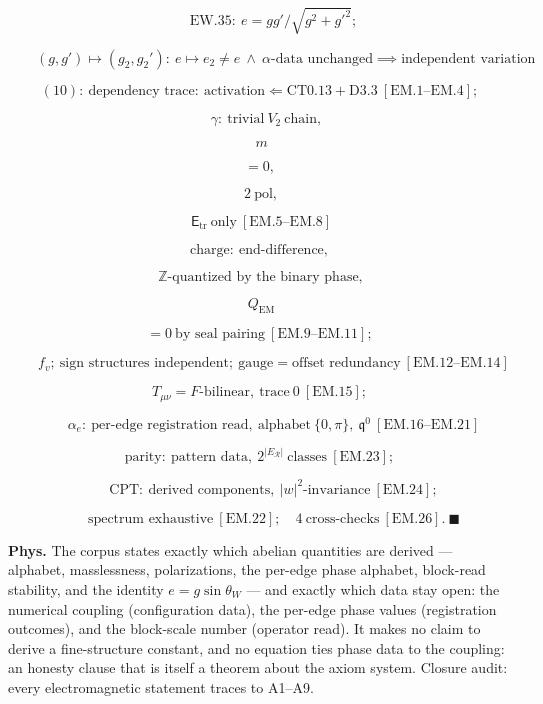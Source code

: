 \begin{theorem}
\[
\qquad \mathrm{EW.35}:\ e=gg'/\sqrt{g^2+g'^2};
\]

\[
\qquad (g,g')\mapsto(g_2,g_2'):\ e\mapsto e_2\ne e\ \wedge\ \alpha\text{-data unchanged}\implies\text{independent variation}
\]

\[
(10):\ \text{dependency trace}:\ \text{activation}\Leftarrow\mathrm{CT0.13}+\mathrm{D3.3}\ [\mathrm{EM.1}\text{--}\mathrm{EM.4}];
\]

\[
\quad\gamma:\ \text{trivial}\ V_2\ \text{chain},
\]

\[
\ m
\]

\[
= 0,
\]

\[
\ 2\ \text{pol},
\]

\[
\ \mathsf E_{\mathrm{tr}}\ \text{only}\ [\mathrm{EM.5}\text{--}\mathrm{EM.8}]
\]

\[
\text{charge}:\ \text{end-difference},
\]

\[
\ \mathbb Z\text{-quantized by the binary phase},
\]

\[
\ Q_{\mathrm{EM}}
\]

\[
= 0\ \text{by seal pairing}\ [\mathrm{EM.9}\text{--}\mathrm{EM.11}];
\]

\[
\qquad f_v;\ \text{sign structures independent};\ \text{gauge}=\text{offset redundancy}\ [\mathrm{EM.12}\text{--}\mathrm{EM.14}]
\]

\[
T_{\mu\nu}=F\text{-bilinear},\ \text{trace}\ 0\ [\mathrm{EM.15}];
\]

\[
\qquad \alpha_e:\ \text{per-edge registration read},\ \text{alphabet}\ \{0,\pi\},\ \mathfrak q^0\ [\mathrm{EM.16}\text{--}\mathrm{EM.21}]
\]

\[
\text{parity}:\ \text{pattern data},\ 2^{|E_{\mathcal R}|}\ \text{classes}\ [\mathrm{EM.23}];
\]

\[
\qquad \mathrm{CPT}:\ \text{derived components},\ |w|^2\text{-invariance}\ [\mathrm{EM.24}];
\]

\[
\qquad \text{spectrum exhaustive}\ [\mathrm{EM.22}];\quad4\ \text{cross-checks}\ [\mathrm{EM.26}].\ \blacksquare
\]

\textbf{Phys.} The corpus states exactly which abelian quantities are derived — alphabet, masslessness, polarizations, the per-edge phase alphabet, block-read stability, and the identity $e=g\sin\theta_W$ — and exactly which data stay open: the numerical coupling (configuration data), the per-edge phase values (registration outcomes), and the block-scale number (operator read). It makes no claim to derive a fine-structure constant, and no equation ties phase data to the coupling: an honesty clause that is itself a theorem about the axiom system. Closure audit: every electromagnetic statement traces to A1–A9.

\end{theorem}

